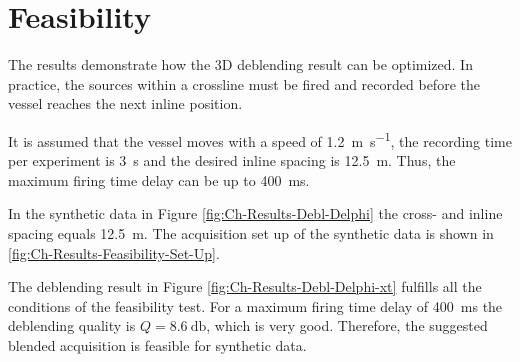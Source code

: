 \section{Feasibility}

The results demonstrate how the 3D deblending result can be optimized. In practice, the sources within a crossline must be fired and recorded before the vessel reaches the next inline position.

It is assumed that the vessel moves with a speed of \SI{1.2}{\metre\per\second}, the recording time per experiment is \SI{3}{\second} and the desired inline spacing is \SI{12.5}{\metre}. Thus, the maximum firing time delay can be up to \SI{400}{\milli\second}.

In the synthetic data in Figure \ref{fig:Ch-Results-Debl-Delphi} the cross- and inline spacing equals \SI{12.5}{\metre}. The acquisition set up of the synthetic data is shown in \ref{fig:Ch-Results-Feasibility-Set-Up}.

The deblending result in Figure \ref{fig:Ch-Results-Debl-Delphi-xt} fulfills all the conditions of the feasibility test. For a maximum firing time delay of \SI{400}{\milli\second} the deblending quality is $Q = \SI{8.6}{\decibel}$, which is very good. Therefore, the suggested blended acquisition is feasible for synthetic data.

